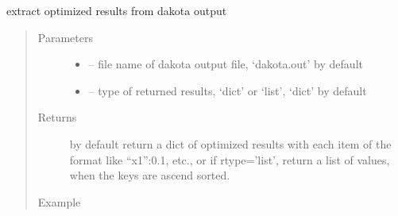 \documentclass[letterpaper,10pt,english]{sphinxmanual}
\begin{document}
\begin{fulllineitems}
\label{\detokenize{src/apidocs/genopt:genopt.get_opt_results}}
extract optimized results from dakota output
\begin{quote}\begin{description}
\item[{Parameters}] \leavevmode\begin{itemize}
\item {} 
 -- file name of dakota output file, 
`dakota.out' by default

\item {} 
 -- type of returned results, `dict' or `list', 
`dict' by default

\end{itemize}

\item[{Returns}] \leavevmode
by default return a dict of optimized results with each item
of the format like ``x1'':0.1, etc., or if rtype='list', return a 
list of values, when the keys are ascend sorted.

\item[{Example}] \leavevmode
\end{description}\end{quote}

\begin{sphinxVerbatim}[commandchars=\\\{\},formatcom=\scriptsize]
   
   
\end{sphinxVerbatim}

\end{fulllineitems}
\end{document}
